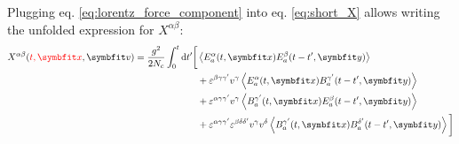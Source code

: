 Plugging eq. \ref{eq:lorentz_force_component} into eq. \ref{eq:short_X} allows writing the unfolded expression for $X^{\alpha \beta}$:
\begin{equation}
	\begin{split}
		X^{\alpha \beta} (\textcolor{red}{t,\mathbf{x}}, \mathbf{v}) =  \frac{g^2}{2 N_c} \int_0^t \diff t'
		\bigg[ &  \left< E^\alpha_a(t, \mathbf{x} ) E^\beta_a(t-t', \mathbf{y} )\right> \\
		& + \varepsilon^{\beta \gamma \gamma'} v^\gamma \left< E^\alpha_a(t, \mathbf{x} ) B^{\gamma'}_a(t-t', \mathbf{y} )\right> \\
		& + \varepsilon^{\alpha \gamma \gamma'} v^\gamma \left< B^{\gamma'}_a(t, \mathbf{x} ) E^{\beta}_a(t-t', \mathbf{y} )\right> \\
		& + \varepsilon^{\alpha \gamma \gamma'} \varepsilon^{\beta \delta \delta'} v^\gamma v^\delta \left< B^{\gamma'}_a(t, \mathbf{x} ) B^{\delta'}_a(t-t', \mathbf{y} )\right> \bigg]
	\end{split}
\end{equation}
